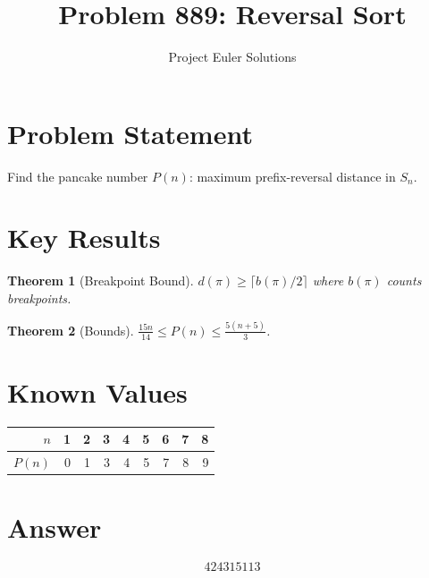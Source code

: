 \documentclass[11pt]{article}
\title{Problem 889: Reversal Sort}
\author{Project Euler Solutions}
\date{}
\newtheorem{theorem}{Theorem}
\begin{document}
\maketitle

\section{Problem Statement}
Find the pancake number $P(n)$: maximum prefix-reversal distance in $S_n$.

\section{Key Results}

\begin{theorem}[Breakpoint Bound]
$d(\pi) \ge \lceil b(\pi)/2 \rceil$ where $b(\pi)$ counts breakpoints.
\end{theorem}

\begin{theorem}[Bounds]
$\frac{15n}{14} \le P(n) \le \frac{5(n+5)}{3}$.
\end{theorem}

\section{Known Values}
\begin{center}
\begin{tabular}{r|rrrrrrrr}
$n$ & 1 & 2 & 3 & 4 & 5 & 6 & 7 & 8 \\ \hline
$P(n)$ & 0 & 1 & 3 & 4 & 5 & 7 & 8 & 9
\end{tabular}
\end{center}

\section{Answer}

\[
\boxed{424315113}
\]
\end{document}

